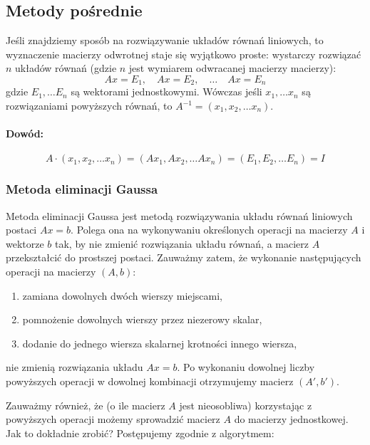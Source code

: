 \documentclass{article}
\begin{document}
\subsection{Metody pośrednie \label{sec:metodyposrednie}}

Jeśli znajdziemy sposób na rozwiązywanie układów równań liniowych, to wyznaczenie macierzy odwrotnej staje się wyjątkowo proste: wystarczy rozwiązać $n$ układów równań (gdzie $n$ jest wymiarem odwracanej macierzy macierzy):
\begin{equation}\label{eq:main}
Ax=E_1, \quad Ax=E_2, \quad \dots \quad Ax=E_n
\end{equation}
gdzie $E_1, \dots E_n$ są wektorami jednostkowymi. Wówczas jeśli $x_1, \dots x_n$ są rozwiązaniami powyższych równań, to $A^{-1} = (x_1, x_2, \dots x_n)$.
\paragraph{Dowód:}
\begin{equation}
A\cdot(x_1, x_2, \dots x_n) = (Ax_1, Ax_2, \dots Ax_n) = (E_1, E_2, \dots E_n) = I
\end{equation}

\subsubsection{\label{sec:gauss} Metoda eliminacji Gaussa}

Metoda eliminacji Gaussa jest metodą rozwiązywania układu równań liniowych postaci $Ax = b$. Polega ona na wykonywaniu określonych operacji na macierzy $A$ i wektorze $b$ tak, by nie zmienić rozwiązania układu równań, a macierz $A$ przekształcić do prostszej postaci. Zauważmy zatem, że wykonanie następujących operacji na macierzy $(A, b)$:
\begin{enumerate}
\item zamiana dowolnych dwóch wierszy miejscami,
\item pomnożenie dowolnych wierszy przez niezerowy skalar,
\item dodanie do jednego wiersza skalarnej krotności innego wiersza,
\end{enumerate}
nie zmienią rozwiązania układu $Ax = b$.
Po wykonaniu dowolnej liczby powyższych operacji w dowolnej kombinacji otrzymujemy macierz $(A', b')$.

Zauważmy również, że (o ile macierz $A$ jest nieosobliwa) korzystając z powyższych operacji możemy sprowadzić macierz $A$ do macierzy jednostkowej. Jak to dokładnie zrobić? Postępujemy zgodnie z algorytmem: \\
\end{document}
